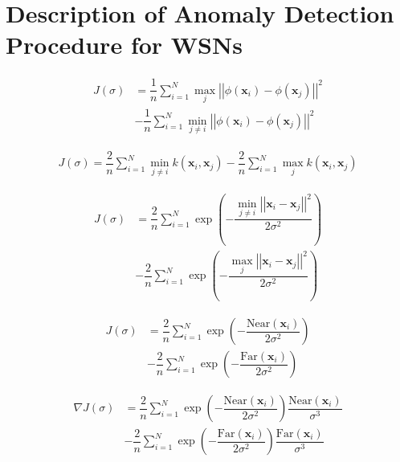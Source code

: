 \documentclass[conference]{IEEEtran}
\theoremstyle{problemstyle}
\begin{document}
\section{Description of Anomaly Detection Procedure for WSNs}

\cite{Xiao2014}

\begin{align}
J (\sigma) &= \dfrac{1}{n} \sum _{i=1}^N \max_j \left|\left| \phi \left( \mathbf{x}_i \right) - \phi \left( \mathbf{x}_j \right) \right|\right|^2 \nonumber \\
&- \dfrac{1}{n} \sum _{i=1}^N \min_{j \ne i} \left|\left| \phi \left( \mathbf{x}_i \right) - \phi \left( \mathbf{x}_j \right) \right|\right|^2 
\end{align}

\begin{align}
J (\sigma) = \dfrac{2}{n} \sum _{i=1}^N \min_{j \ne i}  k \left( \mathbf{x}_i, \mathbf{x}_j\right) - \dfrac{2}{n} \sum _{i=1}^N \max_{j}  k \left( \mathbf{x}_i, \mathbf{x}_j\right) 
\end{align}

\begin{align}
J (\sigma) &=\dfrac{2}{n} \sum _{i=1}^N \exp \left( - \dfrac{\min_{j \ne i} \left|\left| \mathbf{x}_i - \mathbf{x}_j \right|\right|^2}{2 \sigma^2}  \right) \nonumber \\
&- \dfrac{2}{n} \sum _{i=1}^N \exp \left( - \dfrac{\max_j \left|\left| \mathbf{x}_i - \mathbf{x}_j \right|\right|^2}{2 \sigma^2}  \right) 
\end{align}

\begin{align}
J (\sigma) &=\dfrac{2}{n} \sum _{i=1}^N \exp \left( - \dfrac{\text{Near} \left( \mathbf{x}_i \right)}{2 \sigma^2} \right) \nonumber \\
& - \dfrac{2}{n} \sum _{i=1}^N \exp \left( - \dfrac{\text{Far} \left( \mathbf{x}_i \right)}{2 \sigma^2}\right) 
\end{align}

\begin{align}
\nabla J  (\sigma) &= \dfrac{2}{n} \sum _{i=1}^N \exp \left( -\dfrac{\text{Near} \left( \mathbf{x}_i \right)}{2 \sigma^2}\right) \dfrac{\text{Near} \left( \mathbf{x}_i \right)}{\sigma^3} \nonumber \\
& - \dfrac{2}{n} \sum _{i=1}^N \exp \left( -\dfrac{\text{Far} \left( \mathbf{x}_i \right)}{2 \sigma^2}\right) \dfrac{\text{Far} \left( \mathbf{x}_i \right)}{\sigma^3}
\end{align}
\end{document}

